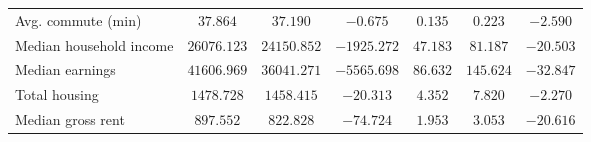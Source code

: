 \begin{table}[tbh]
\begin{threeparttable}
\begin{tabular}{lcccccc}
Avg. commute (min)      &                                                                                    $37.864$ &                                                                                    $37.190$ &                                                                                    $-0.675$ &                                                                                     $0.135$ &                                                                                     $0.223$ &                                                                                    $-2.590$ \\
Median household income &                                                                                 $26076.123$ &                                                                                 $24150.852$ &                                                                                 $-1925.272$ &                                                                                    $47.183$ &                                                                                    $81.187$ &                                                                                   $-20.503$ \\
Median earnings         &                                                                                 $41606.969$ &                                                                                 $36041.271$ &                                                                                 $-5565.698$ &                                                                                    $86.632$ &                                                                                   $145.624$ &                                                                                   $-32.847$ \\
Total housing           &                                                                                  $1478.728$ &                                                                                  $1458.415$ &                                                                                   $-20.313$ &                                                                                     $4.352$ &                                                                                     $7.820$ &                                                                                    $-2.270$ \\
Median gross rent       &                                                                                   $897.552$ &                                                                                   $822.828$ &                                                                                   $-74.724$ &                                                                                     $1.953$ &                                                                                     $3.053$ &                                                                                   $-20.616$ \\

\end{tabular}
\end{threeparttable}
\end{table}
